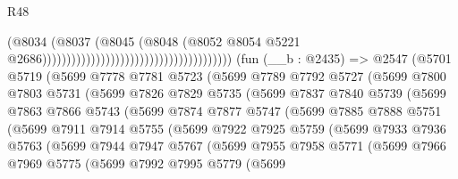 \begin{lexlean}{R48}
\begin{coremodule}
                                                                        (@8034
                                                                          (@8037
                                                                            (@8045
                                                                              (@8048
                                                                                (@8052
                                                                                  @8054
                                                                                  @5221
                                                                                  @2686)))))))))))))))))))))))))))))))))))))))
    (fun (__b : @2435) =>
    @2547
      (@5701
        @5719
        (@5699
          @7778
          @7781
          @5723
          (@5699
            @7789
            @7792
            @5727
            (@5699
              @7800
              @7803
              @5731
              (@5699
                @7826
                @7829
                @5735
                (@5699
                  @7837
                  @7840
                  @5739
                  (@5699
                    @7863
                    @7866
                    @5743
                    (@5699
                      @7874
                      @7877
                      @5747
                      (@5699
                        @7885
                        @7888
                        @5751
                        (@5699
                          @7911
                          @7914
                          @5755
                          (@5699
                            @7922
                            @7925
                            @5759
                            (@5699
                              @7933
                              @7936
                              @5763
                              (@5699
                                @7944
                                @7947
                                @5767
                                (@5699
                                  @7955
                                  @7958
                                  @5771
                                  (@5699
                                    @7966
                                    @7969
                                    @5775
                                    (@5699
                                      @7992
                                      @7995
                                      @5779
                                      (@5699

\end{coremodule}
\end{lexlean}
